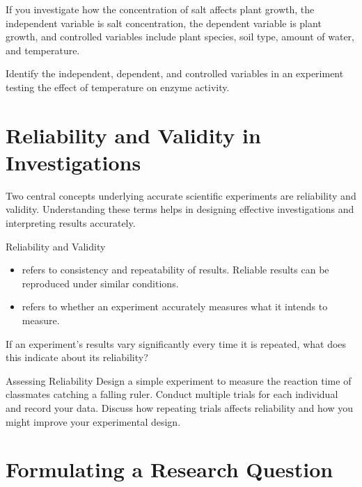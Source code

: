 \begin{example}
If you investigate how the concentration of salt affects plant growth, the independent variable is salt concentration, the dependent variable is plant growth, and controlled variables include plant species, soil type, amount of water, and temperature.
\end{example}

\begin{stopandthink}
Identify the independent, dependent, and controlled variables in an experiment testing the effect of temperature on enzyme activity.
\end{stopandthink}

\section{Reliability and Validity in Investigations}

Two central concepts underlying accurate scientific experiments are reliability and validity. Understanding these terms helps in designing effective investigations and interpreting results accurately.

\begin{keyconcept}{Reliability and Validity}
\begin{itemize}
    \item {} refers to consistency and repeatability of results. Reliable results can be reproduced under similar conditions.
    \item {} refers to whether an experiment accurately measures what it intends to measure.
\end{itemize}
\end{keyconcept}

\begin{stopandthink}
If an experiment's results vary significantly every time it is repeated, what does this indicate about its reliability?
\end{stopandthink}

\begin{investigation}{Assessing Reliability}
Design a simple experiment to measure the reaction time of classmates catching a falling ruler. Conduct multiple trials for each individual and record your data. Discuss how repeating trials affects reliability and how you might improve your experimental design.
\end{investigation}

\section{Formulating a Research Question}

